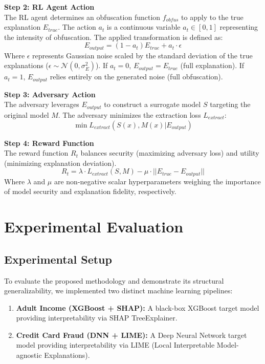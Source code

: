 \documentclass[conference]{IEEEtran}
\begin{document}
\textbf{Step 2: RL Agent Action}\\
The RL agent determines an obfuscation function $f_{obfus}$ to apply to the true explanation $E_{true}$. The action $a_t$ is a continuous variable $a_t \in [0, 1]$ representing the intensity of obfuscation. The applied transformation is defined as:
\begin{equation}
E_{output} = (1 - a_t)E_{true} + a_t \cdot \epsilon
\end{equation}
Where $\epsilon$ represents Gaussian noise scaled by the standard deviation of the true explanations ($\epsilon \sim \mathcal{N}(0, \sigma_E^2)$). If $a_t = 0$, $E_{output} = E_{true}$ (full explanation). If $a_t = 1$, $E_{output}$ relies entirely on the generated noise (full obfuscation).

\textbf{Step 3: Adversary Action}\\
The adversary leverages $E_{output}$ to construct a surrogate model $S$ targeting the original model $M$. The adversary minimizes the extraction loss $L_{extract}$:
\begin{equation}
\min L_{extract}(S(x), M(x) | E_{output})
\end{equation}

\textbf{Step 4: Reward Function}\\
The reward function $R_t$ balances security (maximizing adversary loss) and utility (minimizing explanation deviation). 
\begin{equation}
R_t = \lambda \cdot L_{extract}(S, M) - \mu \cdot ||E_{true} - E_{output}||
\end{equation}
Where $\lambda$ and $\mu$ are non-negative scalar hyperparameters weighing the importance of model security and explanation fidelity, respectively.

\section{Experimental Evaluation}
\subsection{Experimental Setup}
To evaluate the proposed methodology and demonstrate its structural generalizability, we implemented two distinct machine learning pipelines:
\begin{enumerate}
    \item \textbf{Adult Income (XGBoost + SHAP):} A black-box XGBoost target model providing interpretability via SHAP TreeExplainer.
    \item \textbf{Credit Card Fraud (DNN + LIME):} A Deep Neural Network target model providing interpretability via LIME (Local Interpretable Model-agnostic Explanations).
\end{enumerate}
\end{document}
